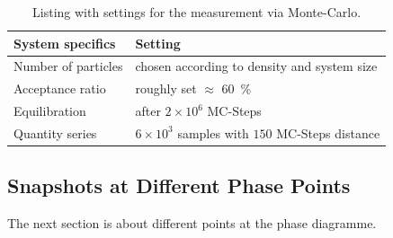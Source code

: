 \begin{table}[ht]
	\centering
	\begin{tabular}{l | l}
		System specifics &Setting \\
		\hline
		Number of particles &chosen according to density and system size\\
		Acceptance ratio&roughly set $\approx$ \SI{60}{\percent}\\
		Equilibration&after $2\times10^6$ MC-Steps\\
		Quantity series&$6\times10^3$ samples with $150$ MC-Steps distance\\
	\end{tabular}
	\caption[MC: Settings]{Listing with settings for the measurement via Monte-Carlo.}
	\label{tbl:MCSettings}
\end{table}

\subsection{Snapshots at Different Phase Points}
The next section is about different points at the phase diagramme.

